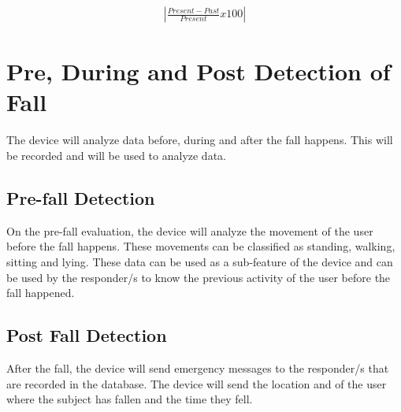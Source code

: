 \begin{eqnarray}
\left| \frac{Present - Past}{Present} x 100 \right|
\end{eqnarray}

\section{Pre, During and Post Detection of Fall}

The device will analyze data before, during and after the fall happens. This will be recorded and will be used to analyze data.

\subsection{Pre-fall Detection}

On the pre-fall evaluation, the device will analyze the movement of the user before the fall happens. These movements can be classified as standing, walking, sitting and lying. These data can be used as a sub-feature of the device and can be used by the responder/s to know the previous activity of the user before the fall happened.

\subsection{Post Fall Detection}
After the fall, the device will send emergency messages to the responder/s that are recorded in the database. The device will send the location and of the user where the subject has fallen and the time they fell.
